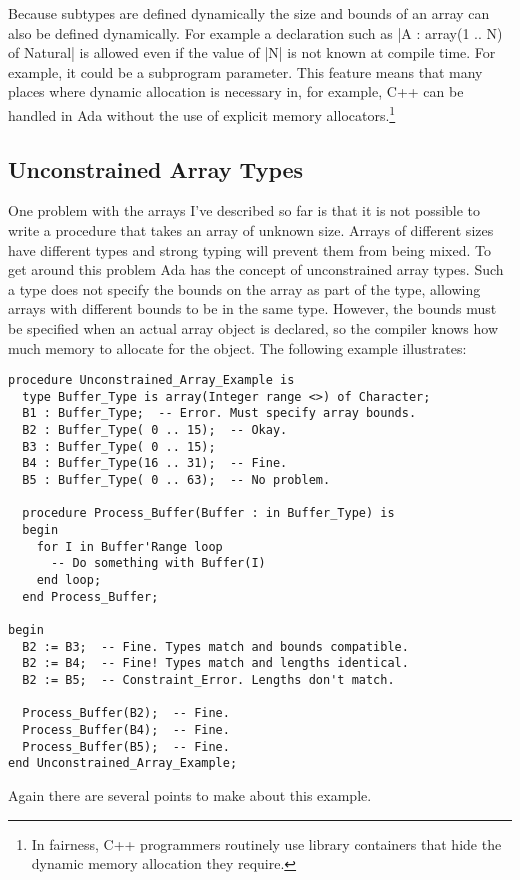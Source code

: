 Because subtypes are defined dynamically the size and bounds of an array can also be defined
dynamically. For example a declaration such as |A : array(1 .. N) of Natural| is allowed even if
the value of |N| is not known at compile time. For example, it could be a subprogram parameter.
This feature means that many places where dynamic allocation is necessary in, for example, C++
can be handled in Ada without the use of explicit memory allocators.\footnote{In fairness, C++
  programmers routinely use library containers that hide the dynamic memory allocation they
  require.}

\subsection{Unconstrained Array Types}

One problem with the arrays I've described so far is that it is not possible to write a
procedure that takes an array of unknown size. Arrays of different sizes have different types
and strong typing will prevent them from being mixed. To get around this problem Ada has the
concept of unconstrained array types. Such a type does not specify the bounds on the array as
part of the type, allowing arrays with different bounds to be in the same type. However, the
bounds must be specified when an actual array object is declared, so the compiler knows how much
memory to allocate for the object. The following example illustrates:

\begin{lstlisting}
procedure Unconstrained_Array_Example is
  type Buffer_Type is array(Integer range <>) of Character;
  B1 : Buffer_Type;  -- Error. Must specify array bounds.
  B2 : Buffer_Type( 0 .. 15);  -- Okay.
  B3 : Buffer_Type( 0 .. 15);
  B4 : Buffer_Type(16 .. 31);  -- Fine.
  B5 : Buffer_Type( 0 .. 63);  -- No problem.

  procedure Process_Buffer(Buffer : in Buffer_Type) is
  begin
    for I in Buffer'Range loop
      -- Do something with Buffer(I)
    end loop;
  end Process_Buffer;

begin
  B2 := B3;  -- Fine. Types match and bounds compatible.
  B2 := B4;  -- Fine! Types match and lengths identical.
  B2 := B5;  -- Constraint_Error. Lengths don't match.

  Process_Buffer(B2);  -- Fine.
  Process_Buffer(B4);  -- Fine.
  Process_Buffer(B5);  -- Fine.
end Unconstrained_Array_Example;
\end{lstlisting}

Again there are several points to make about this example.

